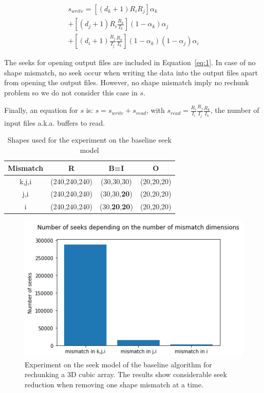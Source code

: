 \documentclass[conference]{IEEEtran}
\begin{document}
\begin{multline} \label{eq:1}
s_{write} = [(d_k+1)R_iR_j]\alpha_k \\ + [(d_j+1)R_i\frac{R_k}{I_k}](1-\alpha_k)\alpha_j \\ + [(d_i+1)\frac{R_j}{I_j}\frac{R_k}{I_k}](1-\alpha_k)(1-\alpha_j)\alpha_i
\end{multline}

The seeks for opening output files are included in Equation~\ref{eq:1}.
In case of no shape mismatch, no seek occur when writing the data into the output
files apart from opening the output files. However, no shape mismatch imply no
rechunk problem so we do not consider this case in $s$.

Finally, an equation for $s$ is: $s = s_{write} + s_{read}$,
with $s_{read} = \frac{R_i}{I_i} \frac{R_j}{I_j} \frac{R_k}{I_k}$, the number of
input files a.k.a. buffers to read.


 \begin{table}[ht]
  \centering
  \caption{Shapes used for the experiment on the baseline seek model}

   \begin{tabular}[t]{c c c c}
   \hline
   Mismatch & R & B=I & O \\
     \hline\hline
     k,j,i & (240,240,240) & (30,30,30) & (20,20,20) \\
     \hline
     j,i & (240,240,240) & (30,30,\textbf{20}) & (20,20,20) \\
     \hline
     i & (240,240,240) & (30,\textbf{20},\textbf{20}) & (20,20,20) \\
     \hline
   \end{tabular}

   \label{tab:expseekmodel}

\end{table}

\begin{figure}[h]
\centering
\includegraphics[scale=0.55]{./figures/baseline_math_model.png}
\caption{Experiment on the seek model of the baseline algorithm for rechunking a 3D cubic array.
The results show considerable seek reduction when removing one shape mismatch at a time.
}
\label{fig:baseline_math_model}
\end{figure}
\end{document}
